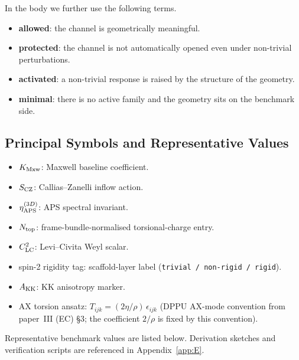In the body we further use the following terms.

\begin{itemize}
  \item \textbf{allowed}: the channel is geometrically meaningful.
  \item \textbf{protected}: the channel is not automatically opened even
        under non-trivial perturbations.
  \item \textbf{activated}: a non-trivial response is raised by the
        structure of the geometry.
  \item \textbf{minimal}: there is no active family and the geometry sits
        on the benchmark side.
\end{itemize}

\subsection{Principal Symbols and Representative Values}
\label{app:A:symbols}

\begin{itemize}
  \item $K_{\mathrm{Mxw}}$: Maxwell baseline coefficient.
  \item $S_{\mathrm{CZ}}$: Callias--Zanelli inflow action.
  \item $\eta_{\mathrm{APS}}^{(3D)}$: APS spectral invariant.
  \item $N_{\mathrm{top}}$: frame-bundle-normalised torsional-charge entry.
  \item $C^2_{\mathrm{LC}}$: Levi--Civita Weyl scalar.
  \item spin-2 rigidity tag: scaffold-layer label
        (\texttt{trivial / non-rigid / rigid}).
  \item $A_{\mathrm{KK}}$: KK anisotropy marker.
  \item AX torsion ansatz: $T_{ijk} = (2\eta/\rho)\,\epsilon_{ijk}$
        (DPPU AX-mode convention from paper~III (EC) \S3; the coefficient
        $2/\rho$ is fixed by this convention).
\end{itemize}

Representative benchmark values are listed below.  Derivation sketches and
verification scripts are referenced in Appendix~\ref{app:E}.

